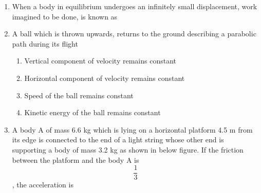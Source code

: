 \documentclass[11pt,a4paper]{article}
\begin{document}
\begin{enumerate}
\\
\item{When a body in equilibrium undergoes an infinitely small displacement, work imagined to be done, is known as}
\\
\item{A ball which is thrown upwards, returns to the ground describing a parabolic path during its flight}
\begin{enumerate}[label=\Alph*.]
\item{Vertical component of velocity remains constant}
\item{Horizontal component of velocity remains constant}
\item{Speed of the ball remains constant}
\item{Kinetic energy of the ball remains constant}
\end{enumerate}
\item{A body A of mass 6.6 kg which is lying on a horizontal platform 4.5 m from its edge is connected to the end of a light string whose other end is supporting a body of mass 3.2 kg as shown in below figure. If the friction between the platform and the body A is $$\frac{1}{3}$$, the acceleration is \\

}
\end{enumerate}
\end{document}

